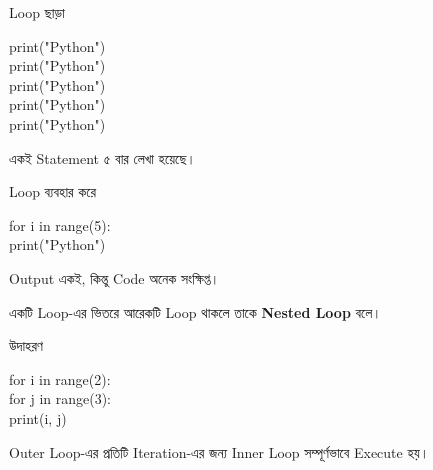 \noindent
\begin{minipage}[t]{0.49\linewidth}

\begin{sideexamplebox}{Loop ছাড়া}

\begin{sidecodebox}
\begin{english}
\ttfamily
print("Python")\\
print("Python")\\
print("Python")\\
print("Python")\\
print("Python")
\end{english}
\end{sidecodebox}

একই Statement ৫ বার লেখা হয়েছে।

\end{sideexamplebox}

\end{minipage}
\hfill
\begin{minipage}[t]{0.49\linewidth}

\begin{sideexamplebox}{Loop ব্যবহার করে}

\begin{sidecodebox}
\begin{english}
\ttfamily
for i in range(5):\\
\hspace*{4mm}print("Python")
\end{english}
\end{sidecodebox}

Output একই, কিন্তু Code অনেক সংক্ষিপ্ত।

\end{sideexamplebox}

\end{minipage}



একটি Loop-এর ভিতরে আরেকটি Loop থাকলে তাকে
\textbf{Nested Loop} বলে।

\begin{examplebox}{উদাহরণ}

\begin{codebox}
\begin{english}
\ttfamily
for i in range(2):\\
\hspace*{4mm}for j in range(3):\\
\hspace*{8mm}print(i, j)
\end{english}
\end{codebox}

Outer Loop-এর প্রতিটি Iteration-এর জন্য Inner Loop সম্পূর্ণভাবে
Execute হয়।

\end{examplebox}

